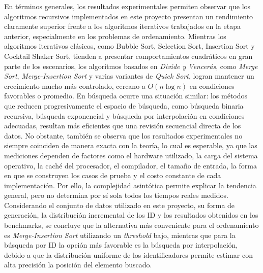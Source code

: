 En términos generales, los resultados experimentales permiten observar que los algoritmos recursivos implementados en este proyecto presentan un rendimiento claramente superior frente a los algoritmos iterativos trabajados en la etapa anterior, especialmente en los problemas de ordenamiento. Mientras los algoritmos iterativos clásicos, como Bubble Sort, Selection Sort, Insertion Sort y Cocktail Shaker Sort, tienden a presentar comportamientos cuadráticos en gran parte de los escenarios, los algoritmos basados en \textit{Divide y Vencerás}, como \textit{Merge Sort}, \textit{Merge-Insertion Sort} y varias variantes de \textit{Quick Sort}, logran mantener un crecimiento mucho más controlado, cercano a $O(n \log n)$ en condiciones favorables o promedio. En búsqueda ocurre una situación similar: los métodos que reducen progresivamente el espacio de búsqueda, como búsqueda binaria recursiva, búsqueda exponencial y búsqueda por interpolación en condiciones adecuadas, resultan más eficientes que una revisión secuencial directa de los datos. No obstante, también se observa que los resultados experimentales no siempre coinciden de manera exacta con la teoría, lo cual es esperable, ya que las mediciones dependen de factores como el hardware utilizado, la carga del sistema operativo, la caché del procesador, el compilador, el tamaño de entrada, la forma en que se construyen los casos de prueba y el costo constante de cada implementación. Por ello, la complejidad asintótica permite explicar la tendencia general, pero no determina por sí sola todos los tiempos reales medidos. Considerando el conjunto de datos utilizado en este proyecto, su forma de generación, la distribución incremental de los ID y los resultados obtenidos en los benchmarks, se concluye que la alternativa más conveniente para el ordenamiento es \textit{Merge-Insertion Sort} utilizando un \textit{threshold} bajo, mientras que para la búsqueda por ID la opción más favorable es la búsqueda por interpolación, debido a que la distribución uniforme de los identificadores permite estimar con alta precisión la posición del elemento buscado.